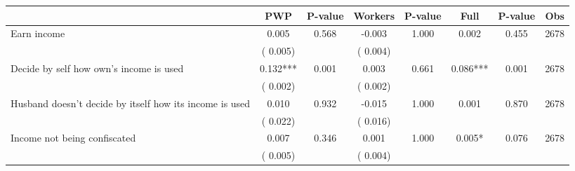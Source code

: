 
\begin{tabular}{l*{7}{c}}\hline&\multicolumn{1}{c}{PWP}&\multicolumn{1}{c}{P-value}&\multicolumn{1}{c}{Workers}&\multicolumn{1}{c}{P-value}&\multicolumn{1}{c}{Full}&\multicolumn{1}{c}{P-value}&\multicolumn{1}{c}{Obs} \\ \hline

 Earn income       &              0.005       &        0.568  &             -0.003       &        1.000  &              0.002       &              0.455 &  2678 \\ 
                       &       (       0.005)             &                               &       (       0.004)                     &                               &                                               &                                &                      \\ 

 Decide by self how own's income is used       &              0.132***       &        0.001  &              0.003       &        0.661  &              0.086***       &              0.001 &  2678 \\ 
                       &       (       0.002)             &                               &       (       0.002)                     &                               &                                               &                                &                      \\ 

 Husband doesn't decide by itself how its income is used       &              0.010       &        0.932  &             -0.015       &        1.000  &              0.001       &              0.870 &  2678 \\ 
                       &       (       0.022)             &                               &       (       0.016)                     &                               &                                               &                                &                      \\ 

 Income not being confiscated       &              0.007       &        0.346  &              0.001       &        1.000  &              0.005*       &              0.076 &  2678 \\ 
                       &       (       0.005)             &                               &       (       0.004)                     &                               &                                               &                                &                      \\ 


\end{tabular}
